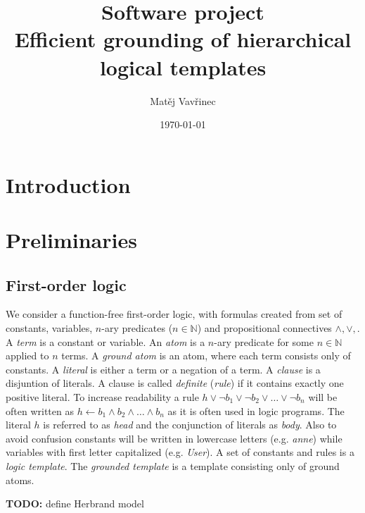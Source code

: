 \documentclass[12pt,oneside]{article}
\begin{document}
\title{Software project \\
\large Efficient grounding of hierarchical logical templates}

\author{Matěj Vavřinec}
\date{\today}

\maketitle

\begin{abstract}

\end{abstract}


\section{Introduction}


\section{Preliminaries}
\subsection{First-order logic}
\label{section:preliminaries:logic}
We consider a function-free first-order logic, with formulas created from set of constants,
variables, $n$-ary predicates ($n \in \mathbb{N}$) and propositional connectives $\wedge, \vee, $. A
\textit{term} is a constant or variable. An \textit{atom} is a $n$-ary predicate for some $n \in
\mathbb{N}$ applied to $n$ terms. A \textit{ground atom} is an atom, where each term consists only
of constants. A \textit{literal} is either a term or a negation of a term. A \textit{clause} is a
disjuntion of literals. A clause is called \textit{definite} (\textit{rule}) if it contains exactly
one positive literal. To increase readability a rule $h \vee \neg b_1 \vee \neg b_2 \vee \dots \vee
\neg b_n$ will be often written as $h \leftarrow b_1 \wedge b_2 \wedge \dots \wedge b_n$ as it is
often used in logic programs. The literal $h$ is referred to as \textit{head} and the conjunction of
literals as \textit{body}. Also to avoid confusion constants will be written in lowercase letters
(e.g. \textit{anne}) while variables with first letter capitalized (e.g. \textit{User}). A set of
constants and rules is a \textit{logic template}. The \textit{grounded template} is a template
consisting only of ground atoms.

\textbf{TODO:} define Herbrand model
\end{document}
